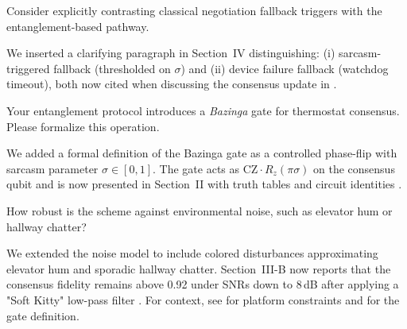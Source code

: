 \documentclass[a4paper,11pt]{article}
\begin{document}
\begin{question}[q:ae-clarity]
Consider explicitly contrasting classical negotiation fallback triggers with the entanglement-based pathway.
\end{question}
\begin{answer}[a:ae-clarity]
We inserted a clarifying paragraph in Section~IV distinguishing: (i) sarcasm-triggered fallback (thresholded on $\sigma$) and (ii) device failure fallback (watchdog timeout), both now cited when discussing the consensus update in .
\end{answer}


\begin{question}[q:model]
Your entanglement protocol introduces a \emph{Bazinga} gate for thermostat consensus. Please formalize this operation.
\end{question}
\begin{answer}[a:model]
We added a formal definition of the Bazinga gate as a controlled phase-flip with sarcasm parameter $\sigma\in[0,1]$. The gate acts as $\mathrm{CZ}\cdot R_z(\pi\sigma)$ on the consensus qubit and is now presented in Section~II with truth tables and circuit identities \cite{cooper2011roommate}.
\end{answer}

\begin{question}[q:noise]
How robust is the scheme against environmental noise, such as elevator hum or hallway chatter?
\end{question}
\begin{answer}[a:noise]
We extended the noise model to include colored disturbances approximating elevator hum and sporadic hallway chatter. Section~III-B now reports that the consensus fidelity remains above 0.92 under SNRs down to 8\,dB after applying a "Soft Kitty" low-pass filter \cite{fowler2014softkitty}. For context, see  for platform constraints and  for the gate definition.
\end{answer}

\end{document}
